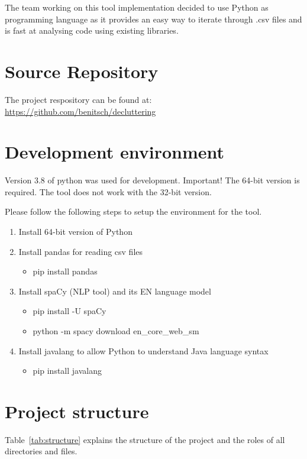 \documentclass[runningheads]{llncs}
\begin{document}
The team working on this tool implementation decided to use Python as programming language as it provides an easy way to iterate through .csv files and is fast at analysing code using existing libraries.


\section{Source Repository}
The project respository can be found at: \url{https://github.com/benitsch/decluttering}


\section{Development environment}
Version 3.8 of python was used for development. Important! The 64-bit version is required. The tool does not work with the 32-bit version.

Please follow the following steps to setup the environment for the tool.
\begin{enumerate}
\item Install 64-bit version of Python \cite{ref_python}
\item Install pandas for reading csv files
\begin{itemize}\item pip install pandas\end{itemize}
\item Install spaCy (NLP tool) and its EN language model
\begin{itemize}\item pip install -U spaCy
\item python -m spacy download en\_core\_web\_sm
\end{itemize}
\item Install javalang to allow Python to understand Java language syntax
\begin{itemize}\item pip install javalang\end{itemize}
\end{enumerate}



\section{Project structure}
Table~\ref{tab:structure} explains the structure of the project and the roles of all directories and files.
\end{document}
